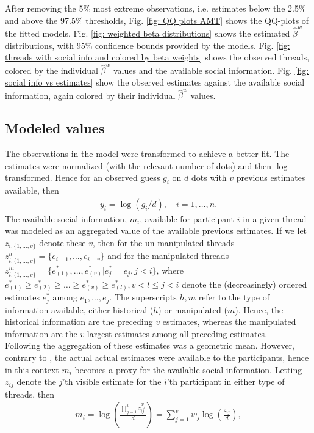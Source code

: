 \documentclass[9pt,twoside,lineno]{pnas-new}
\begin{document}
After removing the 5\% most extreme observations, i.e. estimates below the 2.5\% and above the 97.5\% thresholds, Fig. \ref{fig: QQ plots AMT} shows the QQ-plots of the fitted models. Fig. \ref{fig: weighted beta distributions} shows the estimated $\hat{\beta}^w$ distributions, with 95\% confidence bounds provided by the models. Fig. \ref{fig: threads with social info and colored by beta weights} shows the observed threads, colored by the individual $\hat{\beta}^w$ values and the available social information. Fig. \ref{fig: social info vs estimates} show the observed estimates against the available social information, again colored by their individual $\hat{\beta}^w$ values.

\subsection*{Modeled values}
The observations in the model were transformed to achieve a better fit. The estimates were normalized (with the relevant number of dots) and then $\log$-transformed. Hence for an observed guess $g_i$ on $d$ dots with $v$ previous estimates available, then 
\begin{align*}
	y_i = \log(g_i/d), \quad i=1,\dots,n.
\end{align*}
The available social information, $m_i$, available for participant $i$ in a given thread was modeled as an aggregated value of the available previous estimates. If we let $z_{i,\{1,\dots,v\}}$ denote these $v$, then for the un-manipulated threads $z^h_{i, \{1,\dots,v\}} = \{e_{i-1},\dots,e_{i-v}\}$ and for the manipulated threads $z^m_{i, \{1,\dots,v\}} = \{e^*_{(1)},\dots,e^*_{(v)} | e^*_j=e_j, j<i\}$, where $e^*_{(1)}\geq e^*_{(2)}\geq\dots\geq e^*_{(v)}\geq e^*_{(l)}, v<l\leq j<i$ denote the (decreasingly) ordered estimates $e^*_j$ among $e_1,\dots,e_j$. The superscripts $h,m$ refer to the type of information available, either historical ($h$) or manipulated ($m$). Hence, the historical information are the preceding $v$ estimates, whereas the manipulated information are the $v$ largest estimates among all preceding estimates. \\
Following \citep{jayles2017social} the aggregation of these estimates was a geometric mean. However, contrary to \citep{jayles2017social}, the actual actual estimates were available to the participants, hence in this context $m_i$ becomes a proxy for the available social information. Letting $z_{ij}$ denote the $j$'th visible estimate for the $i$'th participant in either type of threads, then
\begin{align*}
	m_i = \log\left(\frac{\prod_{j=1}^v z_{ij}^{w_j}}{d}\right) %
	= \sum_{j=1}^v w_j \log\left(\frac{z_{ij}}{d}\right),
\end{align*}
\end{document}
